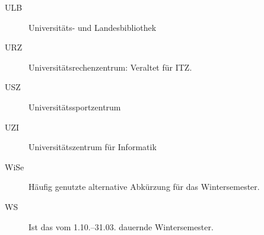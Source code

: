 \begin{description}
\item[ULB] Universitäts- und Landesbibliothek\\
\item[URZ] Universitätsrechenzentrum: Veraltet für ITZ.\
\item[USZ] Universitätssportzentrum\\
\item[UZI] Universitätszentrum für Informatik\\
\item[WiSe] Häufig genutzte alternative Abkürzung für das Wintersemester.
\item[WS] Ist das vom 1.10.--31.03. dauernde Wintersemester.
\end{description}

